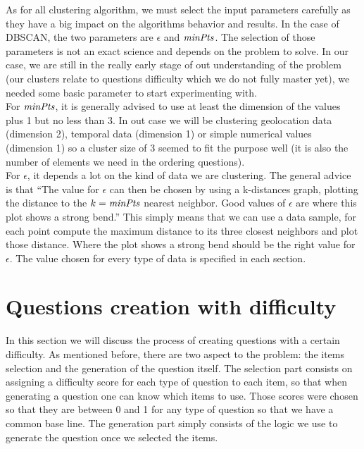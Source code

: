 As for all clustering algorithm, we must select the input parameters carefully as they have a big impact on the algorithms behavior and results. In the case of DBSCAN, the two parameters are $\epsilon$ and $\mathit{minPts}$. The selection of those parameters is not an exact science and depends on the problem to solve. In our case, we are still in the really early stage of out understanding of the problem (our clusters relate to questions difficulty which we do not fully master yet), we needed some basic parameter to start experimenting with.\\
For $\mathit{minPts}$, it is generally advised to use at least the dimension of the values plus 1 but no less than 3\cite{dbscan}. In out case we will be clustering geolocation data (dimension 2), temporal data (dimension 1) or simple numerical values (dimension 1) so a cluster size of 3 seemed to fit the purpose well (it is also the number of elements we need in the ordering questions).\\
For $\epsilon$, it depends a lot on the kind of data we are clustering. The general advice is that ``The value for $\epsilon$ can then be chosen by using a k-distances graph, plotting the distance to the $k = \mathit{minPts}$ nearest neighbor. Good values of $\epsilon$ are where this plot shows a strong bend.''\cite{dbscan} This simply means that we can use a data sample, for each point compute the maximum distance to its three closest neighbors and plot those distance. Where the plot shows a strong bend should be the right value for $\epsilon$. The value chosen for every type of data is specified in each section.

\section{Questions creation with difficulty}
In this section we will discuss the process of creating questions with a certain difficulty. As mentioned before, there are two aspect to the problem: the items selection and the generation of the question itself. The selection part consists on assigning a difficulty score for each type of question to each item, so that when generating a question one can know which items to use. Those scores were chosen so that they are between 0 and 1 for any type of question so that we have a common base line. The generation part simply consists of the logic we use to generate the question once we selected the items.
